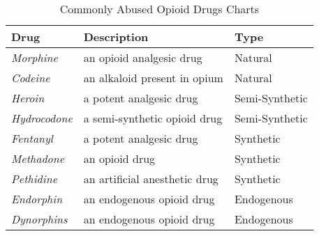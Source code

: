 \documentclass{mcmthesis}
\begin{document}
\begin{table}[htbp]
	\centering
	\caption{ Commonly Abused Opioid Drugs Charts}
	\begin{tabular}{p{3cm}p{7cm}p{3cm}} %
		\addlinespace
		\toprule
		Drug & Description & Type \\%
		\midrule
		  \textit{Morphine}  & an opioid analgesic drug &  Natural   \\%
		  \textit{Codeine}  & an alkaloid present in opium &    Natural      \\      %
		  \textit{Heroin}   & a potent analgesic drug &  Semi-Synthetic  \\          %
		  \textit{Hydrocodone}  & a semi-synthetic opioid drug &  Semi-Synthetic  \\          %
		  \textit{Fentanyl}  & a potent analgesic drug &  Synthetic  \\          %
		  \textit{Methadone}  & an opioid drug & Synthetic   \\          %
		  \textit{Pethidine}  & an artificial anesthetic drug & Synthetic   \\          %
		  \textit{Endorphin}  & an endogenous opioid drug & Endogenous  \\         %
		  \textit{Dynorphins}  & an endogenous opioid drug & Endogenous   \\        %
		\bottomrule
	\end{tabular}%
	\label{tab:addlabel}%
\end{table}%


\end{document}
